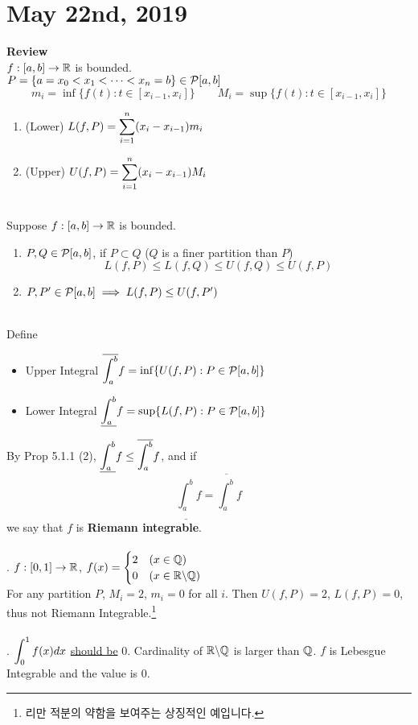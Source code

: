 \section*{May 22nd, 2019}
\textbf{Review}\\
$f:[a, b]\rightarrow\mathbb{R}$ is bounded.\\
$P = \{a = x_0 < x_1 < \cdots < x_n = b\} \in \mathcal{P}[a, b]$\\
$$m_i = \inf\{f(t): t\in [x_{i-1}, x_i] \} \qquad M_i = \sup\{f(t): t\in [x_{i-1}, x_i] \}$$
\begin{enumerate}
	\item (Lower) $L(f, P) = \displaystyle \sum_{i=1}^n (x_i-x_{i-1}) m_i$
	\item (Upper) $U(f, P) = \displaystyle \sum_{i=1}^n (x_i-x_{i-1}) M_i$
\end{enumerate}~\\
 Suppose $f:[a, b]\rightarrow\mathbb{R}$ is bounded.
\begin{enumerate}
	\item $P, Q\in \mathcal{P}[a, b]$, if $P\subset Q$ ($Q$ is a finer partition than $P$)
	$$L(f, P) \leq L(f, Q)\leq U(f, Q)\leq U(f, P)$$
	\item $P, P' \in \mathcal{P}[a, b] \implies L(f, P)\leq U(f, P')$
\end{enumerate}~\\
Define
\begin{itemize}
	\item Upper Integral $\displaystyle \overline{\int_a^b} f = \inf\{U(f, P): P\in \mathcal{P}[a, b] \}$
	\item Lower Integral $\displaystyle \underline{\int_a^b} f = \sup\{L(f, P): P\in \mathcal{P}[a, b] \}$
\end{itemize}
By Prop 5.1.1 (2), $\displaystyle \underline{\int_a^b} f \leq \overline{\int_a^b} f$, and if $$\underline{\int_a^b}f = \overline{\int_a^b}f$$
we say that $f$ is \textbf{Riemann integrable}.\\
\\
\ex. $f:[0, 1]\rightarrow \mathbb{R}$, $f(x) = \begin{cases}
	2 &(x\in \mathbb{Q}) \\ 0 &(x\in \mathbb{R}\backslash\mathbb{Q})
\end{cases}$\\
For any partition $P$, $M_i = 2$, $m_i = 0$ for all $i$. Then $U(f, P) = 2$, $L(f, P) = 0$, thus not Riemann Integrable.\footnote{리만 적분의 약함을 보여주는 상징적인 예입니다.}\\
\\
\rmk. $\displaystyle \int_0^1 f(x)dx$ \underline{should be} 0. Cardinality of $\mathbb{R}\backslash\mathbb{Q}$ is larger than $\mathbb{Q}$. $f$ is Lebesgue Integrable and the value is 0.\\
